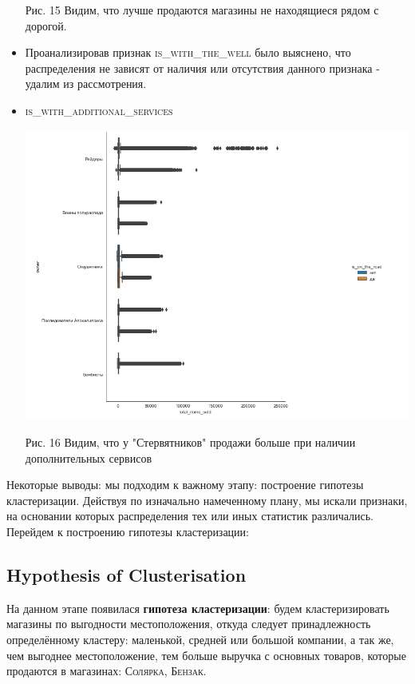 \documentclass[%
10pt, %
final, %
oneside, %
onecolumn, %
centertags]{article} %
\theoremstyle{plain}
\theoremstyle{definition}
\theoremstyle{remark}
\begin{document}
\begin{itemize}
\begin{center}
 	Рис. 15 Видим, что лучше продаются магазины не находящиеся рядом с дорогой.
	\end{center}
	
	\item Проанализировав признак \textsc{is\_with\_the\_well} было выяснено, что распределения не зависят от наличия или отсутствия данного признака - удалим из рассмотрения.
	\item  \textsc{is\_with\_additional\_services}
	\begin{center}
	\includegraphics[scale=0.4]{15.png}

 	Рис. 16 Видим, что у "Стервятников" продажи больше при наличии дополнительных сервисов
	\end{center}
\end{itemize}

Некоторые выводы: мы подходим к важному этапу: построение гипотезы кластеризации. Действуя по изначально намеченному плану, мы искали признаки, на основании которых распределения тех или иных статистик различались. Перейдем к построению гипотезы кластеризации:

\subsection{Hypothesis of Clusterisation}

На данном этапе появилася \textbf{гипотеза кластеризации}: будем кластеризировать магазины по выгодности местоположения, откуда следует принадлежность определённому кластеру: маленькой, средней или большой компании, а так же, чем выгоднее местоположение, тем больше выручка с основных товаров, которые продаются в магазинах: \textsc{Солярка}, \textsc{Бензак}.
\end{document}
